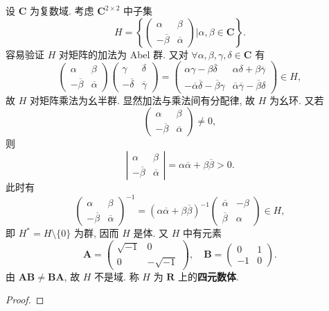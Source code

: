 \documentclass[../../main.tex]{subfiles}
\begin{document}
\begin{example}
设 \( \mathbf{C} \) 为复数域. 考虑 \( \mathbf{C}^{2 \times 2} \) 中子集
\[
H = \left\{ \begin{pmatrix} \alpha & \beta \\ -\overline{\beta} & \overline{\alpha} \end{pmatrix} \bigg| \alpha,\beta \in \mathbf{C} \right\}.
\]
容易验证 \( H \) 对矩阵的加法为 Abel 群. 又对 \( \forall \alpha,\beta,\gamma,\delta \in \mathbf{C} \) 有
\[
\begin{pmatrix} \alpha & \beta \\ -\overline{\beta} & \overline{\alpha} \end{pmatrix} \begin{pmatrix} \gamma & \delta \\ -\overline{\delta} & \overline{\gamma} \end{pmatrix} = \begin{pmatrix} \alpha\gamma - \beta\overline{\delta} & \alpha\delta + \beta\overline{\gamma} \\ -\overline{\alpha}\overline{\delta} - \overline{\beta}\gamma & \overline{\alpha}\overline{\gamma} - \overline{\beta}\delta \end{pmatrix} \in H,
\]
故 \( H \) 对矩阵乘法为幺半群. 显然加法与乘法间有分配律, 故 \( H \) 为幺环. 又若
\[
\begin{pmatrix} \alpha & \beta \\ -\overline{\beta} & \overline{\alpha} \end{pmatrix} \neq 0,
\]
则
\[
\left| \begin{array}{cc} \alpha & \beta \\ -\overline{\beta} & \overline{\alpha} \end{array} \right| = \alpha\overline{\alpha} + \beta\overline{\beta} > 0.
\]
此时有
\[
\begin{pmatrix} \alpha & \beta \\ -\overline{\beta} & \overline{\alpha} \end{pmatrix}^{-1} = (\alpha\overline{\alpha} + \beta\overline{\beta})^{-1} \begin{pmatrix} \overline{\alpha} & -\beta \\ \overline{\beta} & \alpha \end{pmatrix} \in H,
\]
即 \( H^* = H \setminus \{0\} \) 为群, 因而 \( H \) 是体. 又 \( H \) 中有元素
\[
\boldsymbol{A} = \begin{pmatrix} \sqrt{-1} & 0 \\ 0 & -\sqrt{-1} \end{pmatrix}, \quad \boldsymbol{B} = \begin{pmatrix} 0 & 1 \\ -1 & 0 \end{pmatrix}.
\]
由 \( \boldsymbol{AB} \neq \boldsymbol{BA} \), 故 \( H \) 不是域. 称 \( H \) 为 \( \mathbf{R} \) 上的\textbf{四元数体}.
\end{example}
\begin{proof}

\end{proof}
\end{document}
